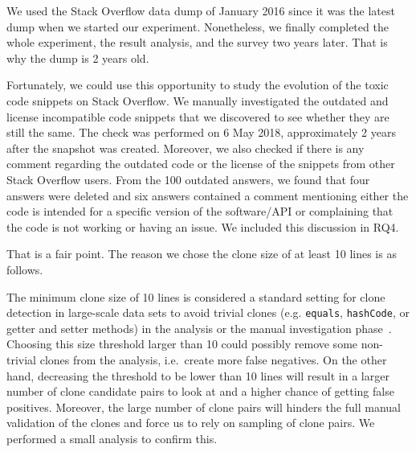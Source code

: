 \documentclass[a4paper,twoside,10pt]{reviewresponse}
\begin{document}

We used the Stack Overflow data dump of January 2016 since it was the latest dump when we started our experiment. Nonetheless, we finally completed the whole experiment, the result analysis, and the survey two years later. That is why the dump is 2 years old.

Fortunately, we could use this opportunity to study the evolution of the toxic code snippets on Stack Overflow. We manually investigated the outdated and license incompatible code snippets that we discovered to see whether they are still the same. The check was performed on 6 May 2018, approximately 2 years after the snapshot was created. Moreover, we also checked if there is any comment regarding the outdated code or the license of the snippets from other Stack Overflow users. From the 100 outdated answers, we found that four answers were deleted and six answers contained a comment mentioning either the code is intended for a specific version of the software/API or complaining that the code is not working or having an issue. 
We included this discussion in RQ4.


That is a fair point. The reason we chose the clone size of at least 10 lines is as follows. 

The minimum clone size of 10 lines is considered a standard setting for clone detection in large-scale data sets to avoid trivial clones (e.g. \texttt{equals}, \texttt{hashCode}, or getter and setter methods) in the analysis or the manual investigation phase~\citep{Sajnani2016}. 
Choosing this size threshold larger than 10 could possibly remove some non-trivial clones from the analysis, i.e.~create more false negatives.
On the other hand, decreasing the threshold to be lower than 10 lines will result in a larger number of clone candidate pairs to look at and a higher chance of getting false positives. Moreover, the large number of clone pairs will hinders the full manual validation of the clones and force us to rely on sampling of clone pairs. We performed a small analysis to confirm this.
\end{document}
